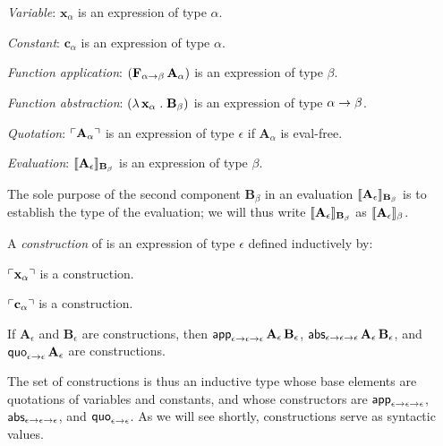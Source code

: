 \documentclass[fleqn]{llncs}
\begin{document}
  \item \emph{Variable}: $\textbf{x}_\alpha$ is an expression of type
    $\alpha$.

  \item \emph{Constant}: $\textbf{c}_\alpha$ is an expression of type
    $\alpha$.

  \item \emph{Function application}: $(\textbf{F}_{\alpha \rightarrow
    \beta} \, \textbf{A}_\alpha)$ is an expression of type $\beta$.

  \item \emph{Function abstraction}: $(\lambda\, \textbf{x}_\alpha
    \mathrel. \textbf{B}_\beta)$ is an expression of type $\alpha \rightarrow
    \beta$.

  \item \emph{Quotation}: $\ulcorner\textbf{A}_\alpha\urcorner$ is an
    expression of type $\epsilon$ if $\textbf{A}_\alpha$ is eval-free.

  \item \emph{Evaluation}: $\llbracket\textbf{A}_\epsilon\rrbracket_{{\bf
      B}_\beta}$ is an expression of type $\beta$.

\ee 

\noindent
The sole purpose of the second component $\textbf{B}_\beta$ in an
evaluation $\llbracket\textbf{A}_\epsilon\rrbracket_{{\bf B}_\beta}$ is to
establish the type of the evaluation; we will thus write
$\llbracket\textbf{A}_\epsilon\rrbracket_{{\bf B}_\beta}$ as
$\llbracket\textbf{A}_\epsilon\rrbracket_\beta$.

A \emph{construction} of {\churchqe} is an expression of type
$\epsilon$ defined inductively by:

\be

  \item $\ulcorner\textbf{x}_\alpha\urcorner$ is a construction.

  \item $\ulcorner\textbf{c}_\alpha\urcorner$ is a construction.

  \item If $\textbf{A}_\epsilon$ and $\textbf{B}_\epsilon$ are
    constructions, then $\mbox{\sf app}_{\epsilon \rightarrow \epsilon
      \rightarrow \epsilon} \, \textbf{A}_\epsilon \,
    \textbf{B}_\epsilon$, $\mbox{\sf abs}_{\epsilon \rightarrow \epsilon
      \rightarrow \epsilon} \, \textbf{A}_\epsilon \,
    \textbf{B}_\epsilon$, and $\mbox{\sf quo}_{\epsilon \rightarrow \epsilon}
    \, \textbf{A}_\epsilon$ are constructions.

\ee

\noindent
The set of constructions is thus an inductive type whose base elements
are quotations of variables and constants, and whose constructors are
$\mbox{\sf app}_{\epsilon \rightarrow \epsilon \rightarrow \epsilon}$,
$\mbox{\sf abs}_{\epsilon \rightarrow \epsilon \rightarrow \epsilon}$, and
$\mbox{\sf quo}_{\epsilon \rightarrow \epsilon}$.  As we will see shortly,
constructions serve as syntactic values.
\end{document}
